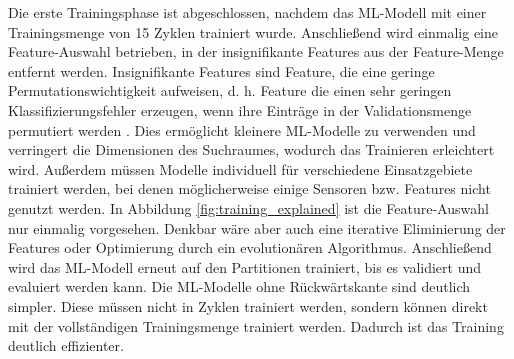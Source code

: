 \newline
\newline
Die erste Trainingsphase ist abgeschlossen, nachdem das ML-Modell mit einer Trainingsmenge von 15 Zyklen trainiert wurde.
Anschließend wird einmalig eine Feature-Auswahl betrieben, in der insignifikante Features aus der Feature-Menge entfernt werden.
Insignifikante Features sind Feature, die eine geringe Permutationswichtigkeit aufweisen, d. h. Feature die einen sehr geringen
Klassifizierungsfehler erzeugen, wenn ihre Einträge in der Validationsmenge permutiert werden \cite{breiman2001random}.
Dies ermöglicht kleinere ML-Modelle zu verwenden und verringert die Dimensionen des Suchraumes, wodurch das Trainieren erleichtert wird.
Außerdem müssen Modelle individuell für verschiedene Einsatzgebiete trainiert werden, bei denen möglicherweise einige Sensoren bzw. Features nicht genutzt werden.
In Abbildung \ref{fig:training_explained} ist die Feature-Auswahl nur einmalig vorgesehen.
Denkbar wäre aber auch eine iterative Eliminierung der Features oder Optimierung durch ein evolutionären Algorithmus.
Anschließend wird das ML-Modell erneut auf den Partitionen trainiert, bis es validiert und evaluiert werden kann.
\newline
\newline
Die ML-Modelle ohne Rückwärtskante sind deutlich simpler.
Diese müssen nicht in Zyklen trainiert werden, sondern können direkt mit der vollständigen Trainingsmenge trainiert werden.
Dadurch ist das Training deutlich effizienter.